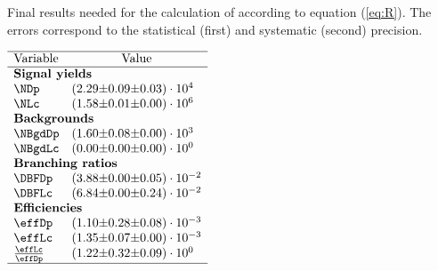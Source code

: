  
\begin{table}[h]
    \centering
    \caption{Final results needed for the calculation of \R according to equation (\ref{eq:R}). The errors correspond to the statistical (first) and systematic (second) precision.}
    \label{tab:table_finalresults.tex}
    $\begin{array}{lr@{\pm}r@{\pm}l}
    \hline
    \text{Variable} & \multicolumn{3}{c}{\text{Value}} \\
    \hline
\multicolumn{4}{l}{\text{\textbf{Signal yields}}} \\
\NDp&(2.29 & 0.09 & 0.03) \cdot 10^{4}\\
\NLc&(1.58 & 0.01 & 0.00) \cdot 10^{6}\\
\multicolumn{4}{l}{\text{\textbf{Backgrounds}}} \\
\NBgdDp&(1.60 & 0.08 & 0.00) \cdot 10^{3}\\
\NBgdLc&(0.00 & 0.00 & 0.00) \cdot 10^{0}\\
\multicolumn{4}{l}{\text{\textbf{Branching ratios}}} \\
\DBFDp&(3.88 & 0.00 & 0.05) \cdot 10^{-2}\\
\DBFLc&(6.84 & 0.00 & 0.24) \cdot 10^{-2}\\
\multicolumn{4}{l}{\text{\textbf{Efficiencies}}} \\
\effDp&(1.10 & 0.28 & 0.08) \cdot 10^{-3}\\
\effLc&(1.35 & 0.07 & 0.00) \cdot 10^{-3}\\
\frac{\effLc}{\effDp}&(1.22 & 0.32 & 0.09) \cdot 10^{0}\\

    \hline
    \end{array}$
\end{table}

